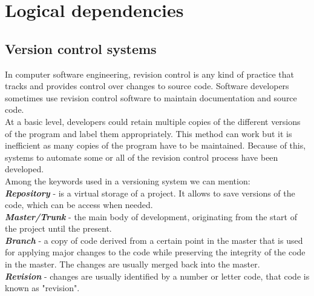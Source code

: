 \section{Logical dependencies}
\subsection{Version control systems}
In computer software engineering, revision control is any kind of practice that tracks and provides control over changes to source code. Software developers sometimes use revision control software to maintain documentation and source code.\\
At a basic level, developers could retain multiple copies of the different versions of the program and label them appropriately. This method can work but it is inefficient as many copies of the program have to be maintained. Because of this, systems to automate some or all of the revision control process have been developed. 
\\ 
\tab Among the keywords used in a versioning system we can mention:\\
\textit{\textbf{Repository}} -  is a virtual storage of a project. It allows to save versions of the code, which can be access when needed.\\
\textit{\textbf{Master/Trunk}} - the main body of development, originating from the start of the project until the present.\\
\textit{\textbf{Branch} }- a copy of code derived from a certain point in the master that is used for applying major changes to the code while preserving the integrity of the code in the master. The changes are usually merged back into the master.\\
\textit{\textbf{Revision}} - changes are usually identified by a number or letter code, that code is known as "revision".\\




